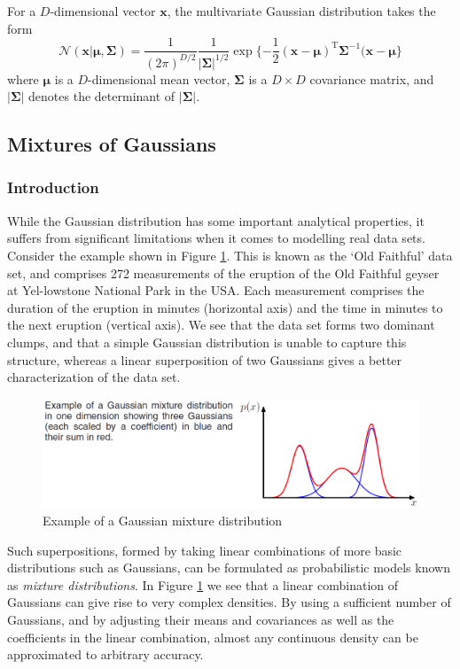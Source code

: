 ﻿\documentclass[a4paper, 11pt]{article}
\numberwithin{equation}{subsection}
\begin{document}
For a $D$-dimensional vector $\mathbf x$, the multivariate Gaussian distribution takes the form
\begin{equation}
\mathcal N(\mathbf x|\boldsymbol\mu,\boldsymbol\Sigma)=\frac{1}{(2\pi)^{D/2}}\frac{1}{|\boldsymbol\Sigma|^{1/2}}\exp\{-\frac{1}{2}(\mathbf x-\boldsymbol\mu)^{\mathrm T}\boldsymbol\Sigma^{-1}(\mathbf x-\boldsymbol\mu\}
\end{equation}
where $\boldsymbol\mu$ is a $D$-dimensional mean vector, $\boldsymbol\Sigma$ is a $D\times D$ covariance matrix, and $|\boldsymbol\Sigma|$ denotes the determinant of $|\boldsymbol\Sigma|$.
\subsection{Mixtures of Gaussians}
\subsubsection{Introduction}
While the Gaussian distribution has some important analytical properties, it suffers from significant limitations when it comes to modelling real data sets. Consider the example shown in Figure \ref{fig:fig1}. This is known as the ‘Old Faithful’ data set, and comprises 272 measurements of the eruption of the Old Faithful geyser at Yel-lowstone National Park in the USA. Each measurement comprises the duration of the eruption in minutes (horizontal axis) and the time in minutes to the next eruption (vertical axis). We see that the data set forms two dominant clumps, and that a simple Gaussian distribution is unable to capture this structure, whereas a linear superposition of two Gaussians gives a better characterization of the data set.
\begin{figure}[ht]
\centering
\includegraphics[width=17cm]{fig1.png}
\caption{Example of a Gaussian mixture distribution}
\label{fig:fig1}
\end{figure}

Such superpositions, formed by taking linear combinations of more basic distributions such as Gaussians, can be formulated as probabilistic models known as \emph{mixture distributions}. In Figure \ref{fig:fig1} we see that a linear combination of Gaussians can give rise to very complex densities. By using a sufficient number of Gaussians, and by adjusting their means and covariances as well as the coefficients in the linear combination, almost any continuous density can be approximated to arbitrary accuracy.
\end{document}
